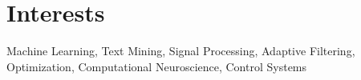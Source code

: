 \section{\sc Interests}

Machine Learning, Text Mining, Signal Processing, Adaptive Filtering, Optimization, Computational Neuroscience, Control Systems
